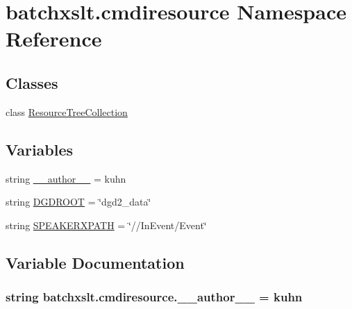 \hypertarget{namespacebatchxslt_1_1cmdiresource}{}\section{batchxslt.\+cmdiresource Namespace Reference}
\label{namespacebatchxslt_1_1cmdiresource}
\subsection*{Classes}
\begin{DoxyCompactItemize}
\item 
class \hyperlink{classbatchxslt_1_1cmdiresource_1_1_resource_tree_collection}{Resource\+Tree\+Collection}
\end{DoxyCompactItemize}
\subsection*{Variables}
\begin{DoxyCompactItemize}
\item 
string \hyperlink{namespacebatchxslt_1_1cmdiresource_a3db22ac28c595bb815ea1f0059f778cc}{\+\_\+\+\_\+author\+\_\+\+\_\+} = \textquotesingle{}kuhn\textquotesingle{}
\item 
string \hyperlink{namespacebatchxslt_1_1cmdiresource_a545fd40ddfc73856f5b84e69f214d74b}{D\+G\+D\+R\+O\+O\+T} = \char`\"{}dgd2\+\_\+data\char`\"{}
\item 
string \hyperlink{namespacebatchxslt_1_1cmdiresource_a0bb689afce27aa1d1e418d3c25b00378}{S\+P\+E\+A\+K\+E\+R\+X\+P\+A\+T\+H} = \char`\"{}//In\+Event/Event\char`\"{}
\end{DoxyCompactItemize}


\subsection{Variable Documentation}
\hypertarget{namespacebatchxslt_1_1cmdiresource_a3db22ac28c595bb815ea1f0059f778cc}{}
\subsubsection[{\+\_\+\+\_\+author\+\_\+\+\_\+}]{\setlength{\rightskip}{0pt plus 5cm}string batchxslt.\+cmdiresource.\+\_\+\+\_\+author\+\_\+\+\_\+ = \textquotesingle{}kuhn\textquotesingle{}}\label{namespacebatchxslt_1_1cmdiresource_a3db22ac28c595bb815ea1f0059f778cc}
\hypertarget{namespacebatchxslt_1_1cmdiresource_a545fd40ddfc73856f5b84e69f214d74b}{}
